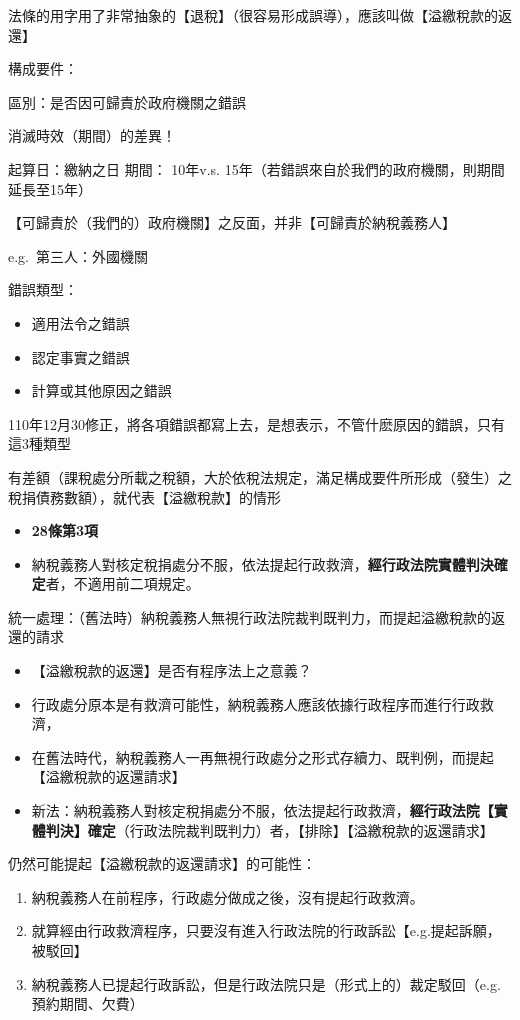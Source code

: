 \documentclass[]{ctexbook}
\providecommand{\tightlist}{%
  \setlength{\itemsep}{0pt}\setlength{\parskip}{0pt}}
\begin{document}
法條的用字用了非常抽象的【退稅】（很容易形成誤導），應該叫做【溢繳稅款的返還】

構成要件：

區別：是否因可歸責於政府機關之錯誤

消滅時效（期間）的差異！

起算日：繳納之日
期間： 10年v.s. 15年（若錯誤來自於我們的政府機關，則期間延長至15年）

【可歸責於（我們的）政府機關】之反面，并非【可歸責於納稅義務人】

e.g.~第三人：外國機關

錯誤類型：

\begin{itemize}
\tightlist
\item
  適用法令之錯誤
\item
  認定事實之錯誤
\item
  計算或其他原因之錯誤
\end{itemize}

110年12月30修正，將各項錯誤都寫上去，是想表示，不管什麽原因的錯誤，只有這3種類型

有差額（課稅處分所載之稅額，大於依稅法規定，滿足構成要件所形成（發生）之稅捐債務數額），就代表【溢繳稅款】的情形

\begin{itemize}
\tightlist
\item
  \textbf{28條第3項}
\item
  納稅義務人對核定稅捐處分不服，依法提起行政救濟，\textbf{經行政法院實體判決確定}者，不適用前二項規定。
\end{itemize}

統一處理：（舊法時）納稅義務人無視行政法院裁判既判力，而提起溢繳稅款的返還的請求

\begin{itemize}
\tightlist
\item
  【溢繳稅款的返還】是否有程序法上之意義？
\item
  行政處分原本是有救濟可能性，納稅義務人應該依據行政程序而進行行政救濟，
\item
  在舊法時代，納稅義務人一再無視行政處分之形式存續力、既判例，而提起【溢繳稅款的返還請求】
\item
  新法：納稅義務人對核定稅捐處分不服，依法提起行政救濟，\textbf{經行政法院【實體判決】確定}（行政法院裁判既判力）者，【排除】【溢繳稅款的返還請求】
\end{itemize}

仍然可能提起【溢繳稅款的返還請求】的可能性：

\begin{enumerate}
\def\labelenumi{\arabic{enumi}.}
\tightlist
\item
  納稅義務人在前程序，行政處分做成之後，沒有提起行政救濟。
\item
  就算經由行政救濟程序，只要沒有進入行政法院的行政訴訟【e.g.提起訴願，被駁回】
\item
  納稅義務人已提起行政訴訟，但是行政法院只是（形式上的）裁定駁回（e.g.預約期間、欠費）
\end{enumerate}
\end{document}
